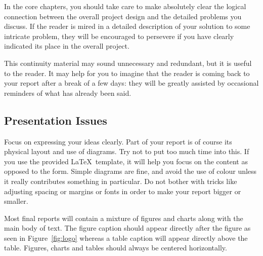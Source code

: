 \documentclass[]{final_report}
\begin{document}
In the core chapters, you should take care to make absolutely clear the logical connection between the overall project design and the detailed problems you discuss. If the reader is mired in a detailed description of your solution to some intricate problem, they will be encouraged to persevere if you have clearly indicated its place in the overall project.

This continuity material may sound unnecessary and redundant, but it is useful to the reader. It may help for you to imagine that the reader is coming back to your report after a break of a few days: they will be greatly assisted by occasional reminders of what has already been said.

\subsection{Presentation Issues}

Focus on expressing your ideas clearly. Part of your report is of course its physical layout and use of diagrams. Try not to put too much time into this. If you use the provided \LaTeX\ template, it will help you focus on the content as opposed to the form. Simple diagrams are fine, and avoid the use of colour unless it really contributes something in particular. Do not bother with tricks like adjusting spacing or margins or fonts in order to make your report bigger or smaller.

Most final reports will contain a mixture of figures and charts along with the main body of text. The figure caption should appear directly after the figure as seen in Figure~\ref{fig:logo} whereas a table caption will appear directly above the table. Figures, charts and tables should always be centered horizontally. 
\end{document}
